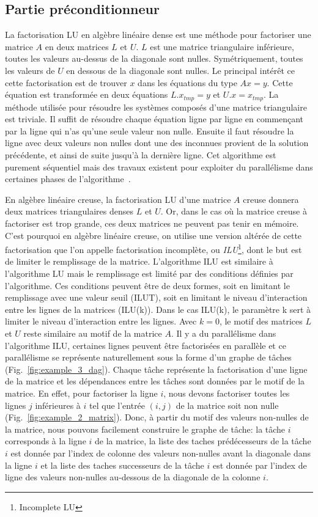 \subsection{Partie préconditionneur}
La factorisation LU en algèbre linéaire dense est une méthode pour factoriser une matrice $A$ en deux matrices $L$ et $U$.
%
$L$ est une matrice triangulaire inférieure, toutes les valeurs au-dessus de la diagonale sont nulles.
%
Symétriquement, toutes les valeurs de $U$ en dessous de la diagonale sont nulles.
%
Le principal intérêt ce cette factorisation est de trouver $x$ dans les équations du type $Ax=y$.
%
Cette équation est transformée en deux équations $L.x_{tmp}=y$ et $U.x=x_{tmp}$.
%
La méthode utilisée pour résoudre les systèmes composés d'une matrice triangulaire est triviale.
%
Il suffit de résoudre chaque équation ligne par ligne en commençant par la ligne qui n'as qu'une seule valeur non nulle.
%
Ensuite il faut résoudre la ligne avec deux valeurs non nulles dont une des inconnues provient de la solution précédente, et ainsi de suite jusqu'à la dernière ligne.
%
Cet algorithme est purement séquentiel mais des travaux existent pour exploiter du parallélisme dans certaines phases de l'algorithme~\cite{plasma_lu}.



En algèbre linéaire creuse, la factorisation LU d'une matrice $A$ creuse donnera deux matrices triangulaires denses $L$ et $U$.
%
Or, dans le cas où la matrice creuse à factoriser est trop grande, ces deux matrices ne peuvent pas tenir en mémoire.
%
C'est pourquoi en algèbre linéaire creuse, on utilise une version altérée de cette factorisation que l'on appelle factorisation incomplète, ou {\em ILU}\footnote{Incomplete LU}, dont le but est de limiter le remplissage de la matrice.
%
L'algorithme ILU est similaire à l'algorithme LU mais le remplissage est limité par des conditions définies par l'algorithme.
%
Ces conditions peuvent être de deux formes, soit en limitant le remplissage avec une valeur seuil (ILUT), soit en limitant le niveau d'interaction entre les lignes de la matrices (ILU(k)).
%
Dans le cas ILU(k), le paramètre k sert à limiter le niveau d'interaction entre les lignes.
%
Avec $k=0$, le motif des matrices $L$ et $U$ reste similaire au motif de la matrice $A$.
%
Il y a du parallélisme dans l'algorithme ILU, certaines lignes peuvent être factorisées en parallèle et ce parallélisme se représente naturellement sous la forme d'un graphe de tâches (Fig.~\ref{fig:example_3_dag}).
%
Chaque tâche représente la factorisation d'une ligne de la matrice et les dépendances entre les tâches sont données par le motif de la matrice.
%
En effet, pour factoriser la ligne $i$, nous devons factoriser toutes les lignes $j$ inférieures à $i$ tel que l'entrée $(i,j)$ de la matrice soit non nulle (Fig.~\ref{fig:example_2_matrix}).
%
Donc, à partir du motif des valeurs non-nulles de la matrice, nous pouvons facilement construire le graphe de tâche:
%
la tâche $i$ corresponds à la ligne $i$ de la matrice, la liste des taches prédécesseurs de la tâche $i$ est donnée par l'index de colonne des valeurs non-nulles avant la diagonale dans la ligne $i$ et la liste des taches successeurs de la tâche $i$ est donnée par l'index de ligne des valeurs non-nulles au-dessous de la diagonale de la colonne $i$.

